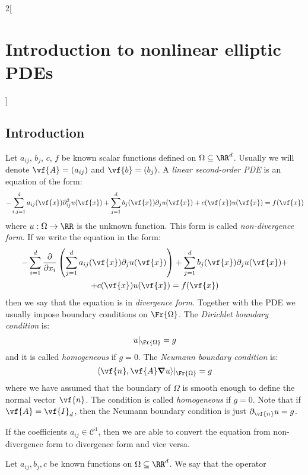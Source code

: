 \documentclass[../../../main_math.tex]{subfiles}
\begin{document}
\begin{multicols}{2}[\section{Introduction to nonlinear elliptic PDEs}]
  \subsection{Introduction}
  \begin{definition}
    Let $a_{ij}$, $b_j$, $c$, $f$ be known scalar functions defined on $\Omega\subseteq \RR^d$. Usually we will denote $\vf{A}=(a_{ij})$ and $\vf{b}=(b_j)$. A \emph{linear second-order PDE} is an equation of the form:
    \begin{equation*}
      -\sum_{i,j=1}^da_{ij}(\vf{x})\partial_{ij}^2u(\vf{x})+\sum_{j=1}^db_j(\vf{x})\partial_ju(\vf{x})+c(\vf{x})u(\vf{x})=f(\vf{x})
    \end{equation*}
    where $u:\Omega\to \RR$ is the unknown function. This form is called \emph{non-divergence form}. If we write the equation in the form:
    \begin{multline*}
      -\sum_{i=1}^d\pdv{}{x_i}\left(\sum_{j=1}^da_{ij}(\vf{x})\partial_ju(\vf{x})\right)+\sum_{j=1}^db_j(\vf{x})\partial_ju(\vf{x})+\\+c(\vf{x})u(\vf{x})=f(\vf{x})
    \end{multline*}
    then we say that the equation is in \emph{divergence form}. Together with the PDE we usually impose boundary conditions on $\Fr{\Omega}$. The \emph{Dirichlet boundary condition} is:
    $$
      u|_{\Fr{\Omega}}=g
    $$
    and it is called \emph{homogeneous} if $g=0$. The \emph{Neumann boundary condition} is:
    $$
      \langle \vf{n},\vf{A} \grad u\rangle|_{\Fr{\Omega}}=g
    $$
    where we have assumed that the boundary of $\Omega$ is smooth enough to define the normal vector $\vf{n}$. The condition is called \emph{homogeneous} if $g=0$. Note that if $\vf{A}=\vf{I}_d$, then the Neumann boundary condition is just $\partial_{\vf{n}} u=g$.
  \end{definition}
  \begin{remark}
    If the coefficients $a_{ij}\in\mathcal{C}^1$, then we are able to convert the equation from non-divergence form to divergence form and vice versa.
  \end{remark}
  \begin{definition}
    Let $a_{ij},b_j,c$ be known functions on $\Omega\subseteq \RR^d$. We say that the operator

\end{definition}
\end{multicols}
\end{document}
